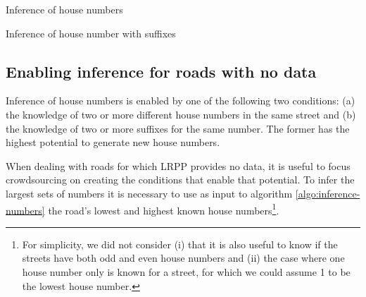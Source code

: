 \vspace{5mm}

\begin{algorithm}[H]
    \caption{Inference of house numbers}
    \label{algo:inference-numbers}
\end{algorithm}

\vspace{5mm}

\begin{algorithm}[H]
    \caption{Inference of house number with suffixes}
    \label{algo:inference-numbers-suffix}
\end{algorithm}

\subsection{Enabling inference for roads with no data} 

Inference of house numbers is enabled by one of the following two conditions: (a) the knowledge of two or more different house numbers in the same street and (b) the knowledge of two or more suffixes for the same number. The former has the highest potential to generate new house numbers.

When dealing with roads for which LRPP provides no data, it is useful to focus crowdsourcing on creating the conditions that enable that potential. To infer the largest sets of numbers it is necessary to use as input to algorithm \ref{algo:inference-numbers} the road's lowest and highest known house numbers\footnote{For simplicity, we did not consider (i) that it is also useful to know if the streets have both odd and even house numbers and (ii) the case where one house number only is known for a street, for which we could assume 1 to be the lowest house number.}.

